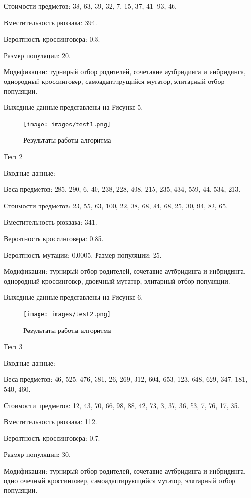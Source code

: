 \documentclass{article}
\begin{document}
\begin{enumerate}
Стоимости предметов: 38, 63, 39, 32, 7, 15, 37, 41, 93, 46.

Вместительность рюкзака: 394.

Вероятность кроссинговера: 0.8.

Размер популяции: 20.

Модификации: турнирый отбор родителей, сочетание аутбридинга и инбридинга, однородный кроссинговер, самоадаптирущийся мутатор, элитарный отбор популяции.

Выходные данные представлены на Рисунке 5.
\begin{figure}[h!]
\centering
\texttt{[image: images/test1.png]}
\caption{Результаты работы алгоритма}
\label{fig:mpr}
\end{figure}

Тест 2

Входные данные:

Веса предметов: 285, 290, 6, 40, 238, 228, 408, 215, 235, 434, 559, 44, 534, 213.

Стоимости предметов: 23, 55, 63, 100, 22, 38, 68, 84, 68, 25, 30, 94, 82, 65.

Вместительность рюкзака: 341.

Вероятность кроссинговера: 0.85.

Вероятность мутации: 0.0005.
Размер популяции: 25.

Модификации: турнирый отбор родителей, сочетание аутбридинга и инбридинга, однородный кроссинговер, двоичный мутатор, элитарный отбор популяции.

Выходные данные представлены на Рисунке 6.
\begin{figure}[h!]
\centering
\texttt{[image: images/test2.png]}
\caption{Результаты работы алгоритма}
\label{fig:mpr}
\end{figure}

Тест 3

Входные данные:

Веса предметов: 46, 525, 476, 381, 26, 269, 312, 604, 653, 123, 648, 629, 347, 181, 540, 460.

Стоимости предметов: 12, 43, 70, 66, 98, 88, 42, 73, 3, 37, 36, 53, 7, 76, 17, 35.

Вместительность рюкзака: 112.

Вероятность кроссинговера: 0.7.

Размер популяции: 30.

Модификации: турнирый отбор родителей, сочетание аутбридинга и инбридинга, одноточечный кроссинговер, самоадаптирующийся мутатор, элитарный отбор популяции.


\end{enumerate}
\end{document}
